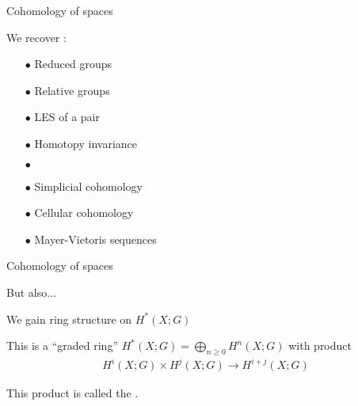 
\begin{frame}{Cohomology of spaces} %

  \par We recover \cite[\ppno~199-204]{hatcher}:
  \begin{itemize}
    \item[$\bullet$] Reduced groups
    \item[$\bullet$] Relative groups
    \item[$\bullet$] LES of a pair
    \item[$\bullet$] Homotopy invariance
    \item[$\bullet$] 
    \item[$\bullet$] Simplicial cohomology
    \item[$\bullet$] Cellular cohomology
    \item[$\bullet$] Mayer-Vietoris sequences
  \end{itemize}
  
\end{frame}

\begin{frame}{Cohomology of spaces} %

  \par But also$\dots$

  \pause
  \begin{block}{}
    \centering
    We gain ring structure on $H^{*} (X ; G)$
  \end{block}

  \pause
  \par This is a ``graded ring'' $H^{*} (X ; G) = \bigoplus_{n \geq 0} H^n (X ; G)$ with product
  \begin{align*}
    H^i (X ; G) \times H^j (X ; G) \to H^{i + j} (X ; G)
  \end{align*}
  \par This product is called the  \cite[\pno~206]{hatcher}.
  
\end{frame}
